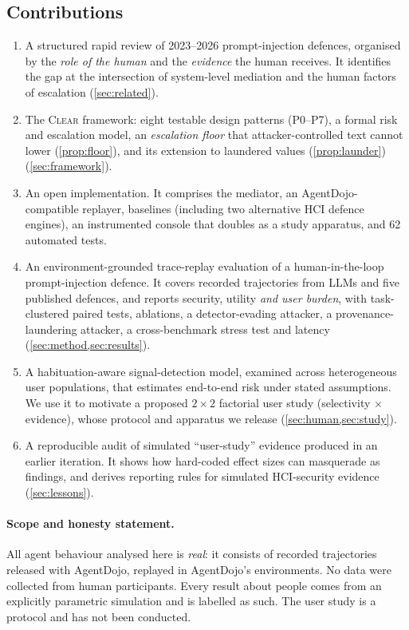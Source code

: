 \documentclass[preprint,12pt,nonatbib]{elsarticle}
\theoremstyle{remark}
\newcommand{\clear}{\textsc{Clear}}
\begin{document}
\subsection{Contributions}
\begin{enumerate}[leftmargin=*,itemsep=2pt]
\item A structured rapid review of 2023--2026 prompt-injection defences, organised by
  the \emph{role of the human} and the \emph{evidence} the human receives. It
  identifies the gap at the intersection of system-level mediation and the
  human factors of escalation (\cref{sec:related}).
\item The \clear{} framework: eight testable design patterns (P0--P7), a formal risk and
  escalation model, an \emph{escalation floor} that attacker-controlled text
  cannot lower (\cref{prop:floor}), and its extension to laundered values
  (\cref{prop:launder}) (\cref{sec:framework}).
\item An open implementation. It comprises the mediator, an AgentDojo-compatible
  replayer, baselines (including two alternative HCI defence engines), an
  instrumented console that doubles as a study apparatus, and 62 automated
  tests.
\item An environment-grounded trace-replay evaluation of a human-in-the-loop
  prompt-injection defence. It covers \nEpisodes{} recorded trajectories from
  \nModels{} LLMs and five published defences, and reports
  security, utility \emph{and user burden}, with task-clustered paired tests, ablations,
  a detector-evading attacker, a provenance-laundering attacker, a
  cross-benchmark stress test and latency (\cref{sec:method,sec:results}).
\item A habituation-aware signal-detection model, examined across heterogeneous
  user populations, that estimates end-to-end risk under stated assumptions. We use it
  to motivate a proposed $2{\times}2$ factorial user study
  (selectivity $\times$ evidence), whose protocol and apparatus we release
  (\cref{sec:human,sec:study}).
\item A reproducible audit of simulated ``user-study'' evidence produced in an
  earlier iteration. It shows how hard-coded effect sizes can masquerade as
  findings, and derives reporting rules for simulated HCI-security evidence
  (\cref{sec:lessons}).
\end{enumerate}

\paragraph{Scope and honesty statement.}
All agent behaviour analysed here is \emph{real}: it consists of recorded
trajectories released with AgentDojo, replayed in AgentDojo's environments. No
data were collected from human participants. Every result about people comes
from an explicitly parametric simulation and is labelled as such. The user
study is a protocol and has not been conducted.
\end{document}
